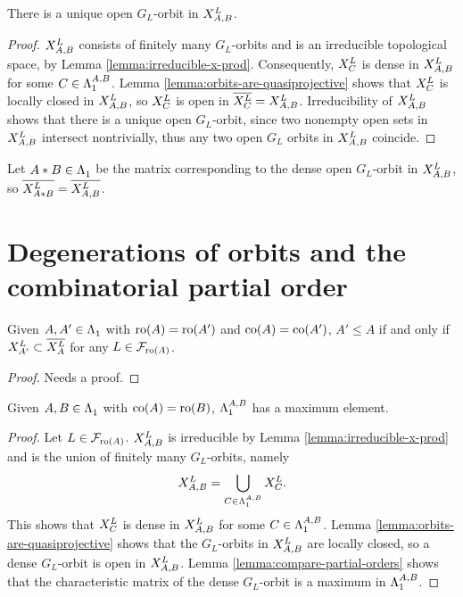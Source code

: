 \documentclass[a4paper, 11pt]{report}
\begin{document}
\begin{proposition}\label{prop:open-orbit-x-prod}
There is a unique open $G_L$-orbit in $\xprod[L]{A,B}$.
\end{proposition}

\begin{proof}
$\xprod[L]{A,B}$ consists of finitely many $G_L$-orbits and is an irreducible topological space, by Lemma \ref{lemma:irreducible-x-prod}. Consequently, $\xprod[L]{C}$ is dense in $\xprod[L]{A,B}$ for some $C\in\matrices[A,B]$. Lemma \ref{lemma:orbits-are-quasiprojective} shows that $\xprod[L]{C}$ is locally closed in $\xprod[L]{A,B}$, so $\xprod[L]{C}$ is open in $\overline{\xprod[L]{C}}=\xprod[L]{A,B}$. Irreducibility of $\xprod[L]{A,B}$ shows that there is a unique open $G_L$-orbit, since two nonempty open sets in $\xprod[L]{A,B}$ intersect nontrivially, thus any two open $G_L$ orbits in $\xprod[L]{A,B}$ coincide.
\end{proof}

Let $A\ast B\in\matrices$ be the matrix corresponding to the dense open $G_L$-orbit in $\xprod[L]{A,B}$, so $\overline{\xprod[L]{A\ast B}}=\overline{\xprod[L]{A,B}}$.

\section{Degenerations of orbits and the combinatorial partial order}{\color{gray}

\begin{lemma}\label{lemma:compare-partial-orders}
Given $A,A'\in\matrices$ with $\ro{A}=\ro{A'}$ and $\co{A}=\co{A'}$, $A'\le A$ if and only if $\xprod[L]{A'}\subset\overline{\xprod[L]{A}}$ for any $L\in\flags_{\ro{A}}$.
\end{lemma}

{\color{blue}
\begin{proof}
Needs a proof.
\end{proof}
}

\begin{proposition}\label{proposition:existence}
Given $A,B\in\matrices$ with $\co{A}=\ro{B}$, $\matrices[A,B]$ has a maximum element.
\end{proposition}

\begin{proof}
Let $L\in\flags_{\ro{A}}$. $\xprod[L]{A,B}$ is irreducible by Lemma \ref{lemma:irreducible-x-prod} and is the union of finitely many $G_L$-orbits, namely
\begin{equation*}
\xprod[L]{A,B} = \bigcup_{C\in\matrices[A,B]} \xprod[L]{C}.
\end{equation*}
This shows that $\xprod[L]{C}$ is dense in $\xprod[L]{A,B}$ for some $C\in\matrices[A,B]$. Lemma \ref{lemma:orbits-are-quasiprojective} shows that the $G_L$-orbits in $\xprod[L]{A,B}$ are locally closed, so a dense $G_L$-orbit is open in $\xprod[L]{A,B}$. Lemma \ref{lemma:compare-partial-orders} shows that the characteristic matrix of the dense $G_L$-orbit is a maximum in $\matrices[A,B]$.
\end{proof}
}
\end{document}
